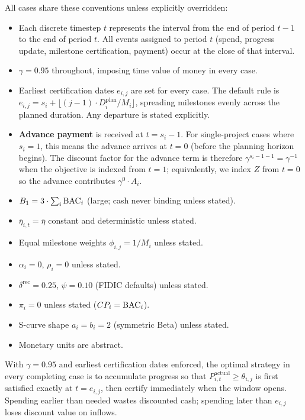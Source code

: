 All cases share these conventions unless explicitly overridden:
\begin{itemize}
  \item Each discrete timestep $t$ represents the interval from the end
    of period $t-1$ to the end of period $t$. All events assigned to
    period $t$ (spend, progress update, milestone certification, payment)
    occur at the close of that interval.
  \item $\gamma = 0.95$ throughout, imposing time value of money in
    every case.
  \item Earliest certification dates $e_{i,j}$ are set for every case.
    The default rule is $e_{i,j} = s_i +
    \lfloor(j-1)\cdot D_i^{\mathrm{plan}}/M_i\rfloor$, spreading
    milestones evenly across the planned duration. Any departure is
    stated explicitly.
  \item \textbf{Advance payment} is received at $t = s_i - 1$. For
    single-project cases where $s_i=1$, this means the advance arrives
    at $t=0$ (before the planning horizon begins). The discount factor
    for the advance term is therefore $\gamma^{s_i-1-1}=\gamma^{-1}$
    when the objective is indexed from $t=1$; equivalently, we index
    $Z$ from $t=0$ so the advance contributes $\gamma^0 \cdot A_i$.
  \item $B_1 = 3\cdot\sum_i \mathrm{BAC}_i$ (large; cash never binding unless
    stated).
  \item $\bar\eta_{i,t}=\bar\eta$ constant and deterministic unless
    stated.
  \item Equal milestone weights $\phi_{i,j}=1/M_i$ unless stated.
  \item $\alpha_i=0$, $\rho_i=0$ unless stated.
  \item $\delta^{\mathrm{rec}}=0.25$, $\psi=0.10$ (FIDIC defaults)
    unless stated.
  \item $\pi_i=0$ unless stated ($CP_i=\mathrm{BAC}_i$).
  \item S-curve shape $a_i=b_i=2$ (symmetric Beta) unless stated.
  \item Monetary units are abstract.
\end{itemize}

\begin{notebox}
\NOTEH With $\gamma=0.95$ and earliest certification dates enforced,
the optimal strategy in every completing case is to accumulate progress
so that $P_{i,t}^{\mathrm{actual}} \geq \theta_{i,j}$ is first
satisfied exactly at $t = e_{i,j}$, then certify immediately when the
window opens. Spending earlier than needed wastes discounted cash;
spending later than $e_{i,j}$ loses discount value on inflows.
\end{notebox}

